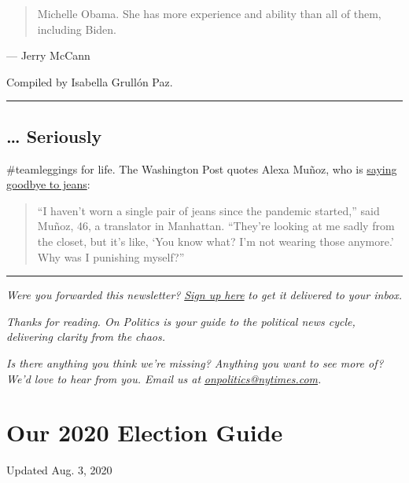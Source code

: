 \begin{quote}
Michelle Obama. She has more experience and ability than all of them,
including Biden.
\end{quote}

--- Jerry McCann

Compiled by Isabella Grullón Paz.

\begin{center}\rule{0.5\linewidth}{\linethickness}\end{center}

\hypertarget{-seriously}{%
\subsection{\ldots{} Seriously}\label{-seriously}}

\#teamleggings for life. The Washington Post quotes Alexa Muñoz, who is
\href{https://www.washingtonpost.com/business/2020/07/28/jeans-sales-leggings-pandemic/}{saying
goodbye to jeans}:

\begin{quote}
``I haven't worn a single pair of jeans since the pandemic started,''
said Muñoz, 46, a translator in Manhattan. ``They're looking at me sadly
from the closet, but it's like, `You know what? I'm not wearing those
anymore.' Why was I punishing myself?''
\end{quote}

\begin{center}\rule{0.5\linewidth}{\linethickness}\end{center}

\emph{Were you forwarded this newsletter?}
\href{https://www.nytimes.com/newsletters/politics}{\emph{Sign up here}}
\emph{to get it delivered to your inbox.}

\emph{Thanks for reading. On Politics is your guide to the political
news cycle, delivering clarity from the chaos.}

\emph{Is there anything you think we're missing? Anything you want to
see more of? We'd love to hear from you. Email us at}
\href{mailto:onpolitics@nytimes.com}{\emph{onpolitics@nytimes.com}}\emph{.}

\hypertarget{our-2020-election-guide}{%
\section{Our 2020 Election Guide}\label{our-2020-election-guide}}

Updated Aug. 3, 2020

